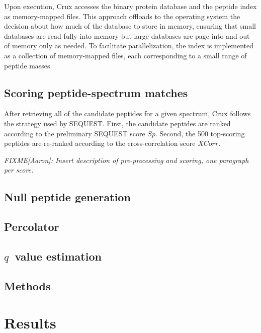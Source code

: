 \documentclass{bioinfo}
\begin{document}
Upon execution, Crux accesses the binary protein database and the
peptide index as memory-mapped files.  This approach offloads to the
operating system the decision about how much of the database to store
in memory, ensuring that small databases are read fully into memory
but large databases are page into and out of memory only as needed.
To facilitate parallelization, the index is implemented as a
collection of memory-mapped files, each corresponding to a small range
of peptide masses.

\subsection{Scoring peptide-spectrum matches}

After retrieving all of the candidate peptides for a given spectrum,
Crux follows the strategy used by SEQUEST.  First, the candidate
peptides are ranked according to the preliminary SEQUEST score $Sp$.
Second, the 500 top-scoring peptides are re-ranked according to the
cross-correlation score $XCorr$.

{\em FIXME[Aaron]: Insert description of pre-processing and scoring,
one paragraph per score.}

\subsection{Null peptide generation}

\subsection{Percolator}

\subsection{$q$~value estimation}

\begin{methods}
\section{Methods}

\end{methods}

\section{Results}
\end{document}
